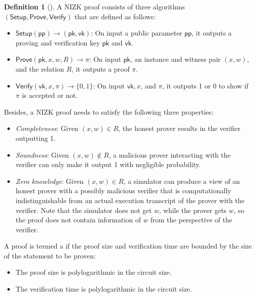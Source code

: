 \documentclass[letterpaper,twocolumn,10pt]{article}
\theoremstyle{definition}
\newtheorem{definition}{Definition}[section]
\newcommand{\zk}{\text{zk-SNARK}\xspace}
\newcommand{\new}[1]{{#1}\xspace}
\begin{document}
\begin{definition}[]
	{{A NIZK proof consists of three algorithms} $(\textsf{Setup}, \textsf{Prove}, \textsf{Verify})$ that are defined as follows: 
		\begin{itemize}[noitemsep, topsep=2pt, partopsep=0pt,leftmargin=0.4cm]
			\item $\textsf{Setup}(\textsf{pp}) \rightarrow (\textsf{pk},\textsf{vk})$: On input a public parameter $\textsf{pp}$, it outputs a proving and verification key $\textsf{pk}$ and $\textsf{vk}$.
			\item $\textsf{Prove}(\textsf{pk},x,w,R)\rightarrow \pi$: On input $\textsf{pk}$, an instance and witness pair $(x,w)$, and the relation $R$, it outputs a proof $\pi$.
			\item $\textsf{Verify}(\textsf{vk},x,\pi)\rightarrow \{0,1\}$: On input $\textsf{vk},x$, and $\pi$, it outputs 1 or 0 to show if $\pi$ is accepted or not. 
		\end{itemize}
		Besides, a NIZK proof needs to satisfy the following three properties:}
	\begin{itemize}[noitemsep, topsep=2pt, partopsep=0pt,leftmargin=0.4cm]
		\item \textit{Completeness}: Given $(x,w)\in R$, the honest prover results in the verifier outputting 1.
		
		\item \textit{Soundness}: Given $(x,w)\notin R$, a malicious prover interacting with the verifier can only make it output 1 with negligible probability.
		
		\item \textit{Zero knowledge}: Given $(x,w)\in R$, a simulator can produce a view of an honest prover with a possibly malicious verifier that is computationally indistinguishable from an actual execution transcript of the prover with the verifier. Note that the simulator does not get $w$, while the prover gets $w$, so the proof does not contain information of $w$ from the perspective of the verifier.
	\end{itemize}
\end{definition}

\new{A  proof is termed a \zk if the proof size and verification time are bounded by the size of the statement to be proven:
	
	\begin{itemize}[noitemsep, topsep=2pt, partopsep=0pt,leftmargin=0.4cm]
		\item The proof size is polylogarithmic in the circuit size.
		\item The verification time is polylogarithmic in the circuit size.
	\end{itemize}
}
\end{document}
